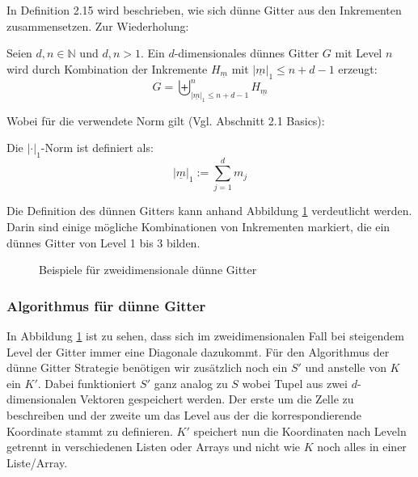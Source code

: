 \documentclass[a4paper,12pt]{llncs}
\numberwithin{equation}{section}
\begin{document}
In \cite{M13} Definition 2.15 wird beschrieben, wie sich dünne Gitter aus den Inkrementen zusammensetzen. Zur Wiederholung:

\begin{definition}
	Seien $d,n\in\mathbb{N}$ und $d,n>1$. Ein $d$-dimensionales dünnes Gitter $G$ mit Level $n$ wird durch Kombination der Inkremente $H_{\underline{m}}$ mit $|\underline{m}|_1\leq n+d-1$ erzeugt:
	\begin{equation}
	G=\biguplus_{|\underline{m}|_1\leq n+d-1}^n H_{\underline{m}}
	\end{equation}
\end{definition}

Wobei für die verwendete Norm gilt (Vgl. \cite{P10} Abschnitt 2.1 Basics):

\begin{definition}
Die  $|\cdot|_1$-Norm ist definiert als:
	\begin{equation}
	|\underline{m}|_1:=\sum_{j=1}^d m_j
	\end{equation}
\end{definition}


Die Definition des dünnen Gitters kann anhand Abbildung \ref{fig:gitter03} verdeutlicht werden. Darin sind einige mögliche Kombinationen von Inkrementen markiert, die ein dünnes Gitter von Level 1 bis 3 bilden.

\begin{figure}
	\caption{Beispiele für zweidimensionale dünne Gitter}
	\label{fig:gitter03}
\end{figure}

\subsubsection{Algorithmus für dünne Gitter}

In Abbildung \ref{fig:gitter03} ist zu sehen, dass sich im zweidimensionalen Fall bei steigendem Level der Gitter immer eine Diagonale dazukommt. Für den Algorithmus der dünne Gitter Strategie benötigen wir zusätzlich noch ein $S'$ und anstelle von $K$ ein $K'$. Dabei funktioniert $S'$ ganz analog zu $S$ wobei Tupel aus zwei $d$-dimensionalen Vektoren gespeichert werden. Der erste um die Zelle zu beschreiben und der zweite um das Level aus der die korrespondierende Koordinate stammt zu definieren. $K'$ speichert nun die Koordinaten nach Leveln getrennt in verschiedenen Listen oder Arrays und nicht wie $K$ noch alles in einer Liste/Array.
\end{document}
